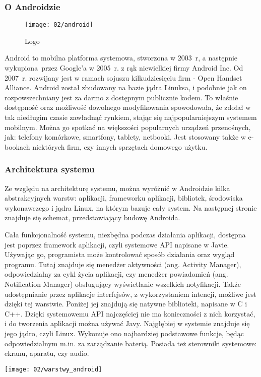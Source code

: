 \subsubsection*{O Androidzie}
\begin{wrapfigure}[9]{l}{0.25\textwidth}
	\vspace{-15pt}
	\begin{center}
		\texttt{[image: 02/android]}
	\end{center}
	\vspace{-10pt}
	\caption{Logo}
	\vspace{-10pt}
\end{wrapfigure}
Android to mobilna platforma systemowa, stworzona w 2003~r, a następnie wykupiona przez Google'a w 2005~r. z rąk niewielkiej firmy Android Inc. Od 2007~r. rozwijany jest w ramach sojuszu kilkudziesięciu firm - Open Handset Alliance. Android został zbudowany na bazie jądra Linuksa, i podobnie jak on rozpowszechniany jest za darmo z dostępnym publicznie kodem. To właśnie dostępność oraz możliwość dowolnego modyfikowania spowodowała, że zdołał w tak niedługim czasie zawładnąć rynkiem, stając się najpopularniejszym systemem mobilnym. Można go spotkać na większości popularnych urządzeń przenośnych, jak: telefony komórkowe, smartfony, tablety, netbooki. Jest stosowany także w e-bookach niektórych firm, czy innych sprzętach domowego użytku. 


\subsubsection*{Architektura systemu}
Ze względu na architekturę systemu, można wyróżnić w Androidzie kilka abstrakcyjnych warstw: aplikacji, frameworku aplikacji, bibliotek, środowiska wykonawczego i jądra Linux, na którym bazuje cały system. Na następnej stronie znajduje się schemat, przedstawiający budowę Androida.

Cała funkcjonalność systemu, niezbędna podczas działania aplikacji, dostępna jest poprzez framework aplikacji, czyli systemowe API napisane w Javie. Używając go, programista może kontrolować sposób działania oraz wygląd programu. Tutaj znajduje się menedżer aktywności (ang. Activity Manager), odpowiedzialny za cykl życia aplikacji, czy menedżer powiadomień (ang. Notification Manager) obsługujący wyświetlanie wszelkich notyfikacji. Także udostępnianie przez aplikacje interfejsów, z wykorzystaniem intencji, możliwe jest dzięki tej warstwie. Poniżej jej znajdują się natywne biblioteki, napisane w C i C++. Dzięki systemowemu API najczęściej nie ma konieczności z nich korzystać, i do tworzenia aplikacji można używać Javy. Najgłębiej w systemie znajduje się jego jądro, czyli Linux. Wykonuje ono najbardziej podstawowe funkcje, będąc odpowiedzialnym m.in. za zarządzanie baterią. Posiada też sterowniki systemowe: ekranu, aparatu, czy audio.
\begin{center}
	\texttt{[image: 02/warstwy\_android]}
\end{center}
